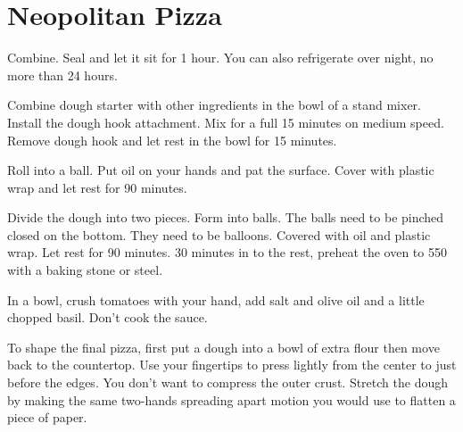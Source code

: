 \section{Neopolitan Pizza}
\begin{recipe}



Combine. Seal and let it sit for 1 hour. You can also refrigerate over night, no more than 24 hours. 


Combine dough starter with other ingredients in the bowl of a stand mixer. Install the dough hook attachment. Mix for a full 15 minutes on medium speed. Remove dough hook and let rest in the bowl for 15 minutes. 

Roll into a ball. Put oil on your hands and pat the surface. Cover with plastic wrap and let rest for 90 minutes. 

Divide the dough into two pieces. Form into balls. The balls need to be pinched closed on the bottom. They need to be balloons. Covered with oil and plastic wrap. Let rest for 90 minutes. 30 minutes in to the rest, preheat the oven to 550\degree{} with a baking stone or steel. 


In a bowl, crush tomatoes with your hand, add salt and olive oil and a little chopped basil. Don't cook the sauce.

To shape the final pizza, first put a dough into a bowl of extra flour then move back to the countertop. 
Use your fingertips to press lightly from the center to just before the edges. You don't want to compress the outer crust.
Stretch the dough by making the same two-hands spreading apart motion you would use to flatten a piece of paper. 


\end{recipe}
